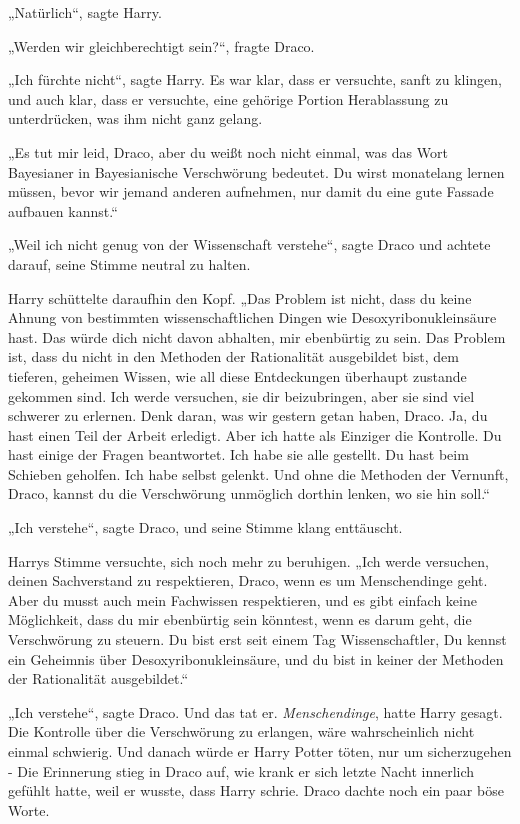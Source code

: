 {„Natürlich“, sagte Harry.

„Werden wir gleichberechtigt sein?“, fragte Draco.

„Ich fürchte nicht“, sagte Harry. Es war klar, dass er versuchte, sanft zu klingen, und auch klar, dass er versuchte, eine gehörige Portion Herablassung zu unterdrücken, was ihm nicht ganz gelang.

„Es tut mir leid, Draco, aber du weißt noch nicht einmal, was das Wort Bayesianer in Bayesianische Verschwörung bedeutet. Du wirst monatelang lernen müssen, bevor wir jemand anderen aufnehmen, nur damit du eine gute Fassade aufbauen kannst.“

„Weil ich nicht genug von der Wissenschaft verstehe“, sagte Draco und achtete darauf, seine Stimme neutral zu halten.

Harry schüttelte daraufhin den Kopf. „Das Problem ist nicht, dass du keine Ahnung von bestimmten wissenschaftlichen Dingen wie Desoxyribonukleinsäure hast. Das würde dich nicht davon abhalten, mir ebenbürtig zu sein. Das Problem ist, dass du nicht in den Methoden der Rationalität ausgebildet bist, dem tieferen, geheimen Wissen, wie all diese Entdeckungen überhaupt zustande gekommen sind. Ich werde versuchen, sie dir beizubringen, aber sie sind viel schwerer zu erlernen. Denk daran, was wir gestern getan haben, Draco. Ja, du hast einen Teil der Arbeit erledigt. Aber ich hatte als Einziger die Kontrolle. Du hast einige der Fragen beantwortet. Ich habe sie alle gestellt. Du hast beim Schieben geholfen. Ich habe selbst gelenkt. Und ohne die Methoden der Vernunft, Draco, kannst du die Verschwörung unmöglich dorthin lenken, wo sie hin soll.“

„Ich verstehe“, sagte Draco, und seine Stimme klang enttäuscht.

Harrys Stimme versuchte, sich noch mehr zu beruhigen. „Ich werde versuchen, deinen Sachverstand zu respektieren, Draco, wenn es um Menschendinge geht. Aber du musst auch mein Fachwissen respektieren, und es gibt einfach keine Möglichkeit, dass du mir ebenbürtig sein könntest, wenn es darum geht, die Verschwörung zu steuern. Du bist erst seit einem Tag Wissenschaftler, Du kennst ein Geheimnis über Desoxyribonukleinsäure, und du bist in keiner der Methoden der Rationalität ausgebildet.“

„Ich verstehe“, sagte Draco. Und das tat er. \emph{Menschendinge}, hatte Harry gesagt. Die Kontrolle über die Verschwörung zu erlangen, wäre wahrscheinlich nicht einmal schwierig. Und danach würde er Harry Potter töten, nur um sicherzugehen - Die Erinnerung stieg in Draco auf, wie krank er sich letzte Nacht innerlich gefühlt hatte, weil er wusste, dass Harry schrie. Draco dachte noch ein paar böse Worte.

}
